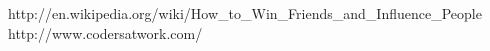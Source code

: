 \begin{center}
                    {http://en.wikipedia.org/wiki/How_to_Win_Friends_and_Influence_People}
                    {http://www.codersatwork.com/}

\end{center}
